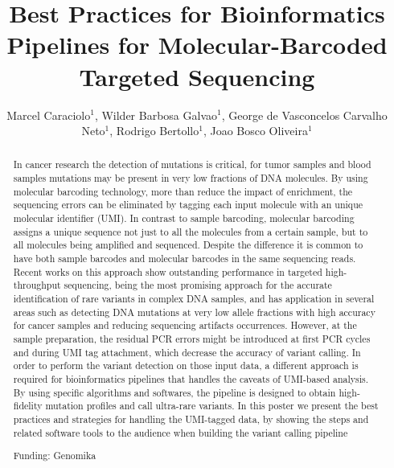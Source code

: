 \documentclass[twoside]{article}
\title{\vspace{-15mm}\fontsize{24pt}{10pt}\selectfont\textbf{Best Practices for Bioinformatics Pipelines for Molecular-Barcoded Targeted Sequencing}} %
\author{Marcel Caraciolo$^1$, Wilder Barbosa Galvao$^1$, George de Vasconcelos Carvalho Neto$^1$, Rodrigo Bertollo$^1$, Joao Bosco Oliveira$^1$}
\affil{1 GENOMIKA\\ }
\date{}
\begin{document}
\maketitle %

\thispagestyle{fancy} %


\begin{abstract}
In cancer research the detection of mutations is critical, for tumor samples and blood samples mutations may be present in very low fractions of DNA molecules. By using molecular barcoding technology, more than reduce the impact of enrichment, the sequencing errors can be eliminated by tagging each input molecule with an unique molecular identifier (UMI). In contrast to sample barcoding, molecular barcoding assigns a unique sequence not just to all the molecules from a certain sample, but to all molecules being amplified and sequenced. Despite the difference it is common to have both sample barcodes and molecular barcodes in the same sequencing reads. Recent works on this approach show outstanding performance in targeted high-throughput sequencing, being the most promising approach for the accurate identification of rare variants in complex DNA samples, and has application in several areas such as detecting DNA mutations at very low allele fractions with high accuracy for cancer samples and reducing sequencing artifacts occurrences. However,  at the sample preparation, the residual PCR errors might be introduced at first PCR cycles and during UMI tag attachment, which decrease the accuracy of variant calling.  In order to perform the variant detection on those input data, a different approach is required for bioinformatics pipelines that handles the caveats of UMI-based analysis. By using specific algorithms and softwares, the pipeline is designed to obtain high-fidelity mutation profiles and call ultra-rare variants.  In this poster we present the best practices and strategies for handling the UMI-tagged data, by showing the steps and related software tools to the audience when building the variant calling pipeline

Funding: Genomika
\end{abstract}
\end{document}
